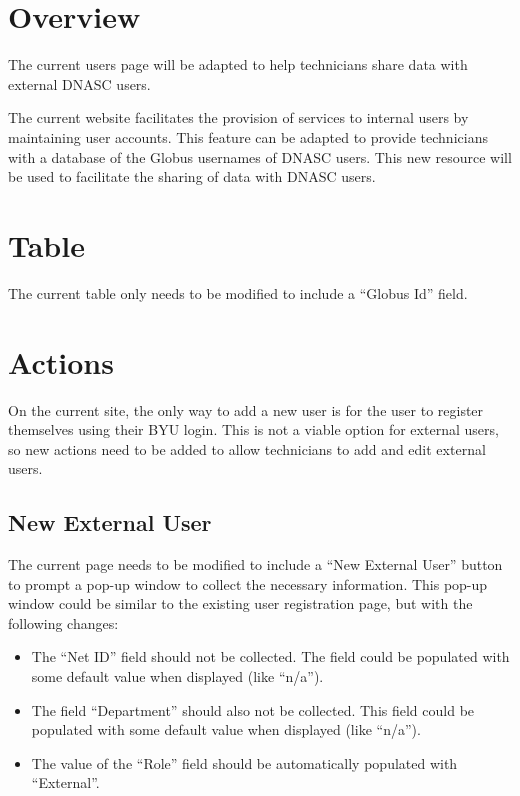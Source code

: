 \section{Overview}

The current users page will be adapted to help technicians share data with 
external DNASC users.

The current website facilitates the provision of services to internal users by
maintaining user accounts. This feature can be adapted to provide technicians
with a database of the Globus usernames of DNASC users. This new resource will 
be used to facilitate the sharing of data with DNASC users.

\section{Table}

The current table only needs to be modified to include a ``Globus Id'' field.

\section{Actions}

On the current site, the only way to add a new user is for the user to register
themselves using their BYU login. This is not a viable option for external users,
so new actions need to be added to allow technicians to add and edit external users.

\subsection{New External User}

The current page needs to be modified to include a ``New External User'' button to
prompt a pop-up window to collect the necessary information. This pop-up window
could be similar to the existing user registration page, but with the following
changes:
\begin{itemize}\itemsep1pt
    \item The ``Net ID'' field should not be collected. The field could be populated 
    with some default value when displayed (like ``n/a'').
    \item The field ``Department'' should also not be collected. This field could be
    populated with some default value when displayed (like ``n/a'').
    \item The value of the ``Role'' field should be automatically populated with 
    ``External''.
\end{itemize}


